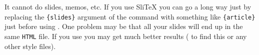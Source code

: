 \begin{htmllist}
\item [It cannot do slides, memos, etc. ] 
If you use Sli\TeX{} you can go a long way just by replacing 
the \verb|{slides}| argument of the  command with 
something like \verb|{article}| just before using \latextohtml.
One problem may be that all your slides will end up in the  same \texttt{HTML} 
file.
If you use  you may get much better results 
( 
to find this or any other style files).
\end{htmllist}

